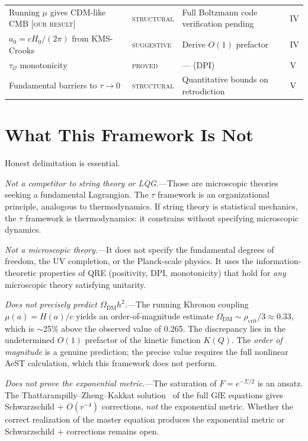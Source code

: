 \documentclass[prd,twocolumn,superscriptaddress,longbibliography,floatfix]{revtex4-2}
\newcommand{\tauasym}{\tau}
\newcommand{\tauO}{\tauasym_{\mathcal{O}}}
\newcommand{\OmDM}{\Omega_{\mathrm{DM}}}
\begin{document}
\begin{table}[t]
\begin{ruledtabular}
\begin{tabular}{llll}
Running $\mu$ gives CDM-like CMB [\textsc{our result}]
& \textsc{structural} & Full Boltzmann code verification pending & IV \\
$a_0 = cH_0/(2\pi)$ from KMS-Crooks
& \textsc{suggestive} & Derive $O(1)$ prefactor & IV \\
$\tauO$ monotonicity
& \textsc{proved} & --- (DPI) & V \\
Fundamental barriers to $\tauasym \to 0$
& \textsc{structural} & Quantitative bounds on retrodiction & V \\
\end{tabular}
\end{ruledtabular}
\end{table}


\section{What This Framework Is Not}
\label{sec:not}

Honest delimitation is essential.

\emph{Not a competitor to string theory or LQG.}---Those
are microscopic theories seeking a fundamental Lagrangian.
The $\tauasym$ framework is an organizational principle,
analogous to thermodynamics.  If string theory is
statistical mechanics, the $\tauasym$ framework is
thermodynamics: it constrains without specifying
microscopic dynamics.

\emph{Not a microscopic theory.}---It does not specify
the fundamental degrees of freedom, the UV completion,
or the Planck-scale physics.  It uses the information-theoretic
properties of QRE (positivity, DPI, monotonicity) that
hold for \emph{any} microscopic theory satisfying
unitarity.

\emph{Does not precisely predict $\OmDM h^2$.}---The
running Khronon coupling $\mu(a) = H(a)/c$ yields an
order-of-magnitude estimate
$\OmDM \sim \rho_{\mathrm{crit}}/3 \approx 0.33$,
which is $\sim$25\% above the observed value of 0.265.
The discrepancy lies in the undetermined $O(1)$
prefactor of the kinetic function $K(Q)$.  The
\emph{order of magnitude} is a genuine prediction;
the precise value requires the full nonlinear AeST
calculation, which this framework does not perform.

\emph{Does not prove the exponential metric.}---The
saturation of $F = e^{-\Sigma/2}$ is an ansatz.
The Thattarampilly--Zheng--Kakkat
solution~\cite{Thattarampilly2026} of the full GfE
equations gives Schwarzschild + $O(r^{-4})$ corrections,
\emph{not} the exponential metric.  Whether the
correct realization of the master equation produces the
exponential metric or Schwarzschild + corrections
remains open.
\end{document}
